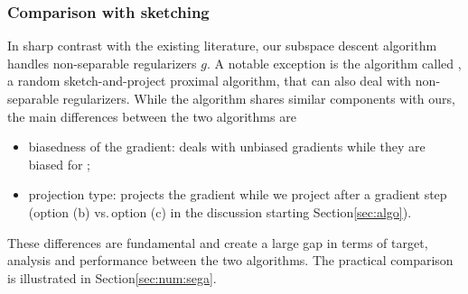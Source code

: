 \subsubsection{Comparison with sketching}

In sharp contrast with the existing literature, our subspace descent algorithm handles non-separable regularizers $g$. A notable exception is the algorithm called \sega \cite{hanzely2018sega}, a random sketch-and-project proximal algorithm, that can also deal with non-separable regularizers. While the algorithm shares similar components with ours, the main differences between the two algorithms are 
\begin{itemize}
    \item {biasedness of the gradient}: \sega deals with unbiased gradients while they are biased for \algo;
\item {projection type}: \sega projects the gradient while we project after a gradient step (option (b) vs.\,option (c) in the discussion starting Section\;\ref{sec:algo}).
\end{itemize} 
These differences are fundamental and create a large gap in terms of target, analysis and performance between the two algorithms. The practical comparison is illustrated in Section\;\ref{sec:num:sega}.

